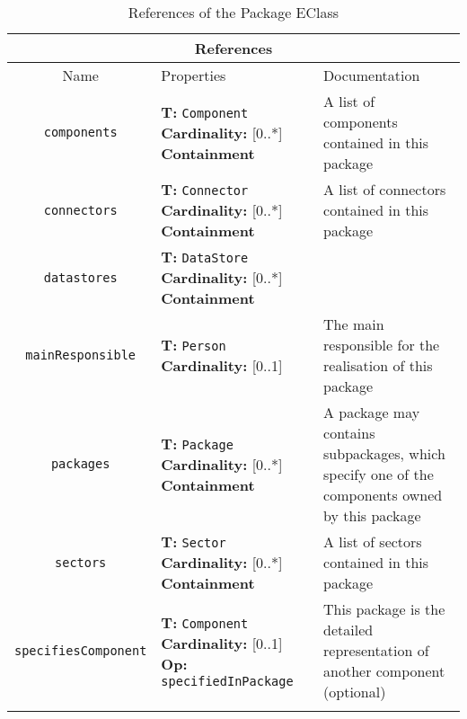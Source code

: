 \documentclass{article}
\begin{document}
\begin{table}[H]
\footnotesize
\begin{tabularx}{\textwidth}{|c| p{4 cm} | X |}
\hline
\multicolumn{3}{|c|}{\textbf{References}} \\
\hline
Name & Properties & Documentation \\ \hline \hline
\texttt{components}
 & 
\textbf{T:} \texttt{Component}
\newline
\textbf{Cardinality:} [0..*]
\newline
\textbf{Containment}
 & A list of components contained in this package\\ \hline
\texttt{connectors}
 & 
\textbf{T:} \texttt{Connector}
\newline
\textbf{Cardinality:} [0..*]
\newline
\textbf{Containment}
 & A list of connectors contained in this package\\ \hline
\texttt{datastores}
 & 
\textbf{T:} \texttt{DataStore}
\newline
\textbf{Cardinality:} [0..*]
\newline
\textbf{Containment}
 & \\ \hline
\texttt{mainResponsible}
 & 
\textbf{T:} \texttt{Person}
\newline
\textbf{Cardinality:} [0..1]
 & The main responsible for the realisation of this package\\ \hline
\texttt{packages}
 & 
\textbf{T:} \texttt{Package}
\newline
\textbf{Cardinality:} [0..*]
\newline
\textbf{Containment}
 & A package may contains subpackages, which specify one of the components owned by this package\\ \hline
\texttt{sectors}
 & 
\textbf{T:} \texttt{Sector}
\newline
\textbf{Cardinality:} [0..*]
\newline
\textbf{Containment}
 & A list of sectors contained in this package\\ \hline
\texttt{specifiesComponent}
 & 
\textbf{T:} \texttt{Component}
\newline
\textbf{Cardinality:} [0..1]
\newline
\textbf{Op:} \texttt{specifiedInPackage}
 & This package is the detailed representation of another component (optional)\\ \hline
\caption{References of the Package EClass}
\end{tabularx}
\label{e4smPackageref}
\end{table}
\end{document}

